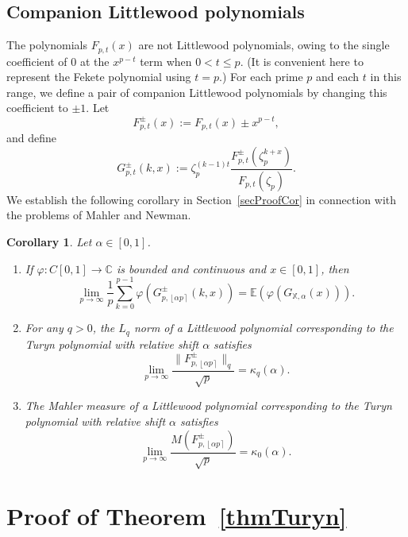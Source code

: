 \documentclass[reqno]{amsart}
\newtheorem{cor}[theorem]{Corollary}
\numberwithin{equation}{section}
\numberwithin{table}{section}
\numberwithin{figure}{section}
\newcommand{\round}[1]{\left\lfloor#1\right\rceil}
\begin{document}
\subsection{Companion Littlewood polynomials}\label{subsecTurynLW}
The polynomials $F_{p,t}(x)$ are not Littlewood polynomials, owing to the single coefficient of $0$ at the $x^{p-t}$ term when $0<t\leq p$.
(It is convenient here to represent the Fekete polynomial using $t=p$.)
For each prime $p$ and each $t$ in this range, we define a pair of companion Littlewood polynomials by changing this coefficient to $\pm1$.
Let
\begin{equation}\label{eqnFptpm}
F_{p,t}^{\pm}(x) := F_{p,t}(x) \pm x^{p-t},
\end{equation}
and define
\begin{equation}\label{eqnGptpm}
G_{p,t}^{\pm}(k,x) := \zeta_p^{(k-1)t} \frac{F_{p,t}^{\pm}(\zeta_p^{k+x})}{F_{p,t}(\zeta_p)}.
\end{equation}
We establish the following corollary in Section~\ref{secProofCor} in connection with the problems of Mahler and Newman.

\begin{cor}\label{corTuryn}
Let $\alpha\in[0,1]$.
\begin{enumerate}[label=(\roman*)]
\item\label{partPhiLW}
If $\varphi : C[0,1] \to \mathbb{C}$ is bounded and continuous and $x\in[0,1]$, then
\[
\lim_{p\to\infty} \frac{1}{p} \sum_{k=0}^{p-1} \varphi\left(G_{p,\round{\alpha p}}^{\pm}(k, x)\right) = \mathbb{E}(\varphi(G_{\mathbb{X},\alpha}(x))).
\]
\item\label{partLqLW}
For any $q>0$, the $L_q$ norm of a Littlewood polynomial corresponding to the Turyn polynomial with relative shift $\alpha$ satisfies
\[
\lim_{p\to\infty} \frac{\big\lVert F_{p,\round{\alpha p}}^{\pm} \big\rVert_q}{\sqrt{p}}
= \kappa_q(\alpha).
\]
\item\label{partMeasureLW}
The Mahler measure of a Littlewood polynomial corresponding to the Turyn polynomial with relative shift $\alpha$ satisfies
\[
\lim_{p\to\infty} \frac{M(F_{p,\round{\alpha p}}^{\pm})}{\sqrt{p}}
= \kappa_0(\alpha).
\]
\end{enumerate}
\end{cor}


\section{Proof of Theorem~\ref{thmTuryn}}\label{secProofThm}
\end{document}
